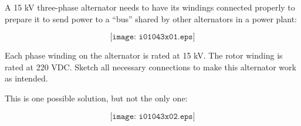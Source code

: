 

A 15 kV three-phase alternator needs to have its windings connected properly to prepare it to send power to a ``bus'' shared by other alternators in a power plant:

$$\texttt{[image: i01043x01.eps]}$$

Each phase winding on the alternator is rated at 15 kV.  The rotor winding is rated at 220 VDC.  Sketch all necessary connections to make this alternator work as intended.







This is one possible solution, but not the only one:

$$\texttt{[image: i01043x02.eps]}$$










